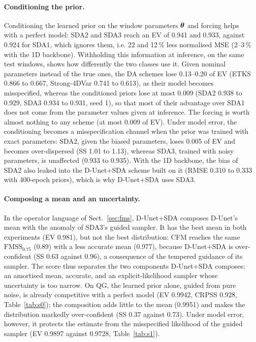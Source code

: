 \paragraph{Conditioning the prior.}
Conditioning the learned prior on the window parameters $\boldsymbol{\theta}$ and forcing helps with a perfect
model: SDA2 and SDA3 reach an EV of 0.941 and 0.933, against 0.924 for SDA1, which ignores them, i.e.
22 and 12\,\% less normalised MSE (2--3\,\% with the 1D backbone). Withholding this information at
inference, on the same \Sz{} test windows, shows how differently the two classes use it. Given nominal
parameters instead of the true ones, the DA schemes lose 0.13--0.20 of EV (ETKS 0.866 to 0.667,
Strong-4DVar 0.741 to 0.613), as their model becomes misspecified, whereas the conditioned priors lose
at most 0.009 (SDA2 0.938 to 0.929, SDA3 0.934 to 0.931, seed 1), so that most of their advantage over
SDA1 does not come from the parameter values given at inference. The forcing is worth almost
nothing to any scheme (at most 0.009 of EV). Under model error, the conditioning becomes a
misspecification channel when the prior was trained with exact parameters: SDA2, given the biased
parameters, loses 0.005 of EV and becomes over-dispersed (SS 1.01 to 1.13), whereas SDA3, trained with
noisy parameters, is unaffected (0.933 to 0.935). With the 1D backbone, the bias of SDA2 also leaked
into the D-Unet+SDA scheme built on it (RMSE 0.310 to 0.333 with 400-epoch priors), which is why
D-Unet+SDA uses SDA3.

\paragraph{Composing a mean and an uncertainty.}
In the operator language of Sect.~\ref{sec:fms}, D-Unet+SDA composes D-Unet's mean with
the anomaly of SDA3's guided sampler. It has the best mean in both experiments (EV 0.981),
but not the best distribution: CFM reaches the same $\mathrm{FMSS}_{0.75}$ (0.89) with a
less accurate mean (0.977), because D-Unet+SDA is over-confident (SS 0.63 against 0.96), a
consequence of the tempered guidance of its sampler. The score thus separates the two components D-Unet+SDA
composes: an amortised mean, accurate, and an explicit-likelihood sampler whose
uncertainty is too narrow. On QG, the learned prior alone, guided from pure noise, is
already competitive with a perfect model (EV 0.9942, CRPSS 0.928, Table~\ref{tab:s0}); the
composition adds little to the mean (0.9951) and makes the distribution markedly
over-confident (SS 0.37 against 0.73). Under model error, however, it protects the estimate
from the misspecified likelihood of the guided sampler (EV 0.9897 against 0.9728,
Table~\ref{tab:s1}). 


